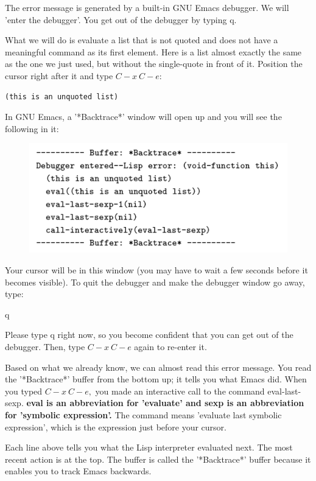 \documentclass[12pt]{book}
\begin{document}
The error message is generated by a built-in GNU Emacs debugger. We will 'enter the debugger'. You get out of the debugger by typing q.

What we will do is evaluate a list that is not quoted and does not have a meaningful command as its first element. Here is a list almost exactly the same as the one we just used, but without the single-quote in front of it. Position the cursor right after it and type $C-x\ C-e:$
\begin{verbatim}
(this is an unquoted list)
\end{verbatim}

In GNU Emacs, a '*Backtrace*' window will open up and you will see the following in it:
\begin{figure}[H]\centering\includegraphics{image//Lisp语言入门//1}\end{figure}

Your cursor will be in this window (you may have to wait a few seconds before it becomes visible). To quit the debugger and make the debugger window go away, type:

q

Please type q right now, so you become confident that you can get out of the debugger. Then, type $C-x\ C-e$ again to re-enter it.

Based on what we already know, we can almost read this error message.
You read the '*Backtrace*' buffer from the bottom up; it tells you what Emacs did. When you typed $C-x\ C-e,$ you made an interactive call to the command eval-last-sexp. {\bf eval is an abbreviation for 'evaluate' and sexp is an abbreviation for 'symbolic expression'.} The command means 'evaluate last symbolic expression', which is the expression just before your cursor.

Each line above tells you what the Lisp interpreter evaluated next. The most recent action is at the top. The buffer is called the '*Backtrace*' buffer because it enables you to track Emacs backwards.
\end{document}
